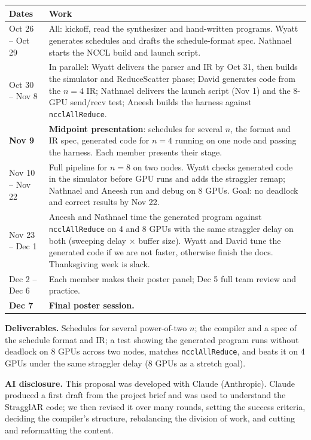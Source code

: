 \documentclass[10pt]{article}
\begin{document}
\begin{tabularx}{\linewidth}{@{}l X@{}}
\toprule
\textbf{Dates} & \textbf{Work} \\
\midrule
Oct 26 -- Oct 29 & All: kickoff, read the synthesizer and hand-written programs. Wyatt generates schedules and drafts the schedule-format spec. Nathnael starts the NCCL build and launch script. \\
Oct 30 -- Nov 8 & In parallel: Wyatt delivers the parser and IR by Oct 31, then builds the simulator and ReduceScatter phase; David generates code from the $n{=}4$ IR; Nathnael delivers the launch script (Nov 1) and the 8-GPU send/recv test; Aneesh builds the harness against \texttt{ncclAllReduce}. \\
\textbf{Nov 9} & \textbf{Midpoint presentation}: schedules for several $n$, the format and IR spec, generated code for $n{=}4$ running on one node and passing the harness. Each member presents their stage. \\
Nov 10 -- Nov 22 & Full pipeline for $n{=}8$ on two nodes. Wyatt checks generated code in the simulator before GPU runs and adds the straggler remap; Nathnael and Aneesh run and debug on 8 GPUs. Goal: no deadlock and correct results by Nov 22. \\
Nov 23 -- Dec 1 & Aneesh and Nathnael time the generated program against \texttt{ncclAllReduce} on 4 and 8 GPUs with the same straggler delay on both (sweeping delay $\times$ buffer size). Wyatt and David tune the generated code if we are not faster, otherwise finish the docs. Thanksgiving week is slack. \\
Dec 2 -- Dec 6 & Each member makes their poster panel; Dec 5 full team review and practice. \\
\textbf{Dec 7} & \textbf{Final poster session.} \\
\bottomrule
\end{tabularx}

\textbf{Deliverables.} Schedules for several power-of-two $n$; the compiler and a spec of the schedule format and IR; a test showing the generated program runs without deadlock on 8 GPUs across two nodes, matches \texttt{ncclAllReduce}, and beats it on 4 GPUs under the same straggler delay (8 GPUs as a stretch goal).

{\small\textbf{AI disclosure.} This proposal was developed with Claude (Anthropic). Claude produced a first draft from the project brief and was used to understand the StragglAR code; we then revised it over many rounds, setting the success criteria, deciding the compiler's structure, rebalancing the division of work, and cutting and reformatting the content.}
\end{document}
